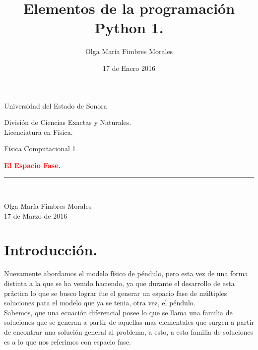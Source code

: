 \documentclass[12pt]{article}
\title{Elementos de la programación Python 1.}
\author{\textcolor{JungleGreen}{Olga María Fimbres Morales}}
\date{17 de Enero 2016}
\begin{document}
\begin{titlepage}

\begin{center}
\begin{large}
Universidad del Estado de Sonora\\
\end{large}
\vspace*{0.15in}
División de Ciencias Exactas y Naturales.\\
\vspace*{0.15in}
Licenciatura en Física. \\
\vspace*{0.6in}
\begin{large}
Física Computacional 1\\
\end{large}
\vspace*{0.2in}
\begin{Large}
\textbf{{\textcolor{Red}{El Espacio Fase.}}} \\
\end{Large}


\rule{80mm}{0.1mm}\\
\vspace*{0.1in}
\begin{large}
{\textcolor{JungleGreen}{Olga María Fimbres Morales}}\\
17 de Marzo de 2016\\
\end{large}
\end{center}
\end{titlepage}

\pagebreak
\section*{Introducción.}
 Nuevamente abordamos el modelo físico de péndulo, pero esta vez de una forma distinta a la que se ha venido haciendo, ya que durante el desarrollo de esta práctica lo que se busco lograr fue el generar un espacio fase de múltiples soluciones para el modelo que ya se tenia, otra vez, el péndulo.\\
 
 Sabemos, que una ecuación diferencial posee lo que se llama una familia de soluciones que se generan a partir de aquellas mas elementales que surgen a partir de encontrar una solución general al problema, a esto, a esta familia de soluciones es a lo que nos referimos con espacio fase.\\
 
\end{document}
